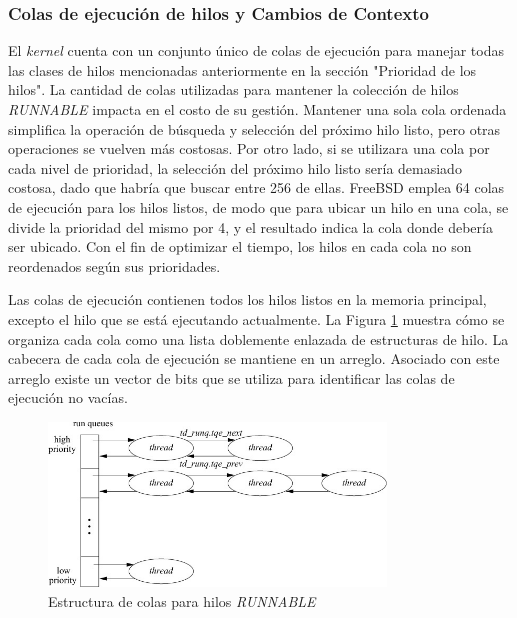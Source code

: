 \subsubsection{Colas de ejecución de hilos y Cambios de Contexto}

El \textit{kernel} cuenta con un conjunto único de colas de ejecución para manejar todas las clases de hilos mencionadas anteriormente en la sección "Prioridad de los hilos". La cantidad de colas utilizadas para mantener la colección de hilos \textit{RUNNABLE} impacta en el costo de su gestión. Mantener una sola cola ordenada simplifica la operación de búsqueda y selección del próximo hilo listo, pero otras operaciones se vuelven más costosas. Por otro lado, si se utilizara una cola por cada nivel de prioridad, la selección del próximo hilo listo sería demasiado costosa, dado que habría que buscar entre 256 de ellas. FreeBSD emplea 64 colas de ejecución para los hilos listos, de modo que para ubicar un hilo en una cola, se divide la prioridad del mismo por 4, y el resultado indica la cola donde debería ser ubicado. Con el fin de optimizar el tiempo, los hilos en cada cola no son reordenados según sus prioridades.\par

Las colas de ejecución contienen todos los hilos listos en la memoria principal, excepto el hilo que se está ejecutando actualmente. La Figura \ref{fig:queueing-structure} muestra cómo se organiza cada cola como una lista doblemente enlazada de estructuras de hilo. La cabecera de cada cola de ejecución se mantiene en un arreglo. Asociado con este arreglo existe un vector de bits que se utiliza para identificar las colas de ejecución no vacías.\par

\begin{figure}[H]
    \centering
    \vspace*{0.2in}
    \includegraphics[width=0.8\textwidth]{./images/queueing-structure.jpg}
    \caption{Estructura de colas para hilos \textit{RUNNABLE}}
    \label{fig:queueing-structure}
\end{figure}

